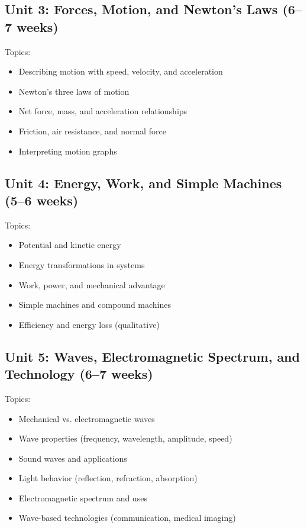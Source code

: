\documentclass[11pt,letterpaper]{report}
\begin{document}
\subsection{Unit 3: Forces, Motion, and Newton’s Laws (6–7 weeks)}

Topics:
\begin{itemize}
\item Describing motion with speed, velocity, and acceleration
\item Newton’s three laws of motion
\item Net force, mass, and acceleration relationships
\item Friction, air resistance, and normal force
\item Interpreting motion graphs
\end{itemize}

\subsection{Unit 4: Energy, Work, and Simple Machines (5–6 weeks)}

Topics:
\begin{itemize}
\item Potential and kinetic energy
\item Energy transformations in systems
\item Work, power, and mechanical advantage
\item Simple machines and compound machines
\item Efficiency and energy loss (qualitative)
\end{itemize}

\subsection{Unit 5: Waves, Electromagnetic Spectrum, and Technology (6–7 weeks)}

Topics:
\begin{itemize}
\item Mechanical vs. electromagnetic waves
\item Wave properties (frequency, wavelength, amplitude, speed)
\item Sound waves and applications
\item Light behavior (reflection, refraction, absorption)
\item Electromagnetic spectrum and uses
\item Wave-based technologies (communication, medical imaging)
\end{itemize}
\end{document}
